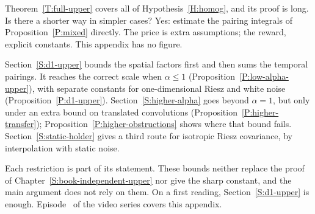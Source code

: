 Theorem~\ref{T:full-upper} covers all of Hypothesis~\ref{H:homog}, and its
proof is long. Is there a shorter way in simpler cases? Yes: estimate the
pairing integrals of Proposition~\ref{P:mixed} directly. The price is extra
assumptions; the reward, explicit constants. This appendix has no figure.

Section~\ref{S:d1-upper} bounds the spatial factors first
and then sums the temporal pairings. It reaches the correct
scale when $\alpha\le 1$ (Proposition~\ref{P:low-alpha-upper}),
with separate constants for one-dimensional Riesz and white noise
(Proposition~\ref{P:d1-upper}). Section~\ref{S:higher-alpha} goes beyond
$\alpha=1$, but only under an extra bound on translated convolutions
(Proposition~\ref{P:higher-transfer}); Proposition~\ref{P:higher-obstructions}
shows where that bound fails. Section~\ref{S:static-holder} gives a third
route for isotropic Riesz covariance, by interpolation with static noise.

Each restriction is part of its statement. These bounds neither replace
the proof of Chapter~\ref{S:book-independent-upper} nor give the sharp
constant, and the main argument does not rely on them. On a first reading,
Section~\ref{S:d1-upper} is enough. Episode~ of
the video series covers this appendix.
